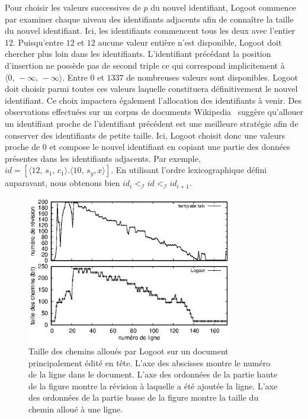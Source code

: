 Pour choisir les valeurs successives de $p$ du nouvel identifiant, Logoot
commence par examiner chaque niveau des identifiants adjacents afin de connaître
la taille du nouvel identifiant. Ici, les identifiants commencent tous les deux
avec l'entier $12$.  Puisqu'entre $12$ et $12$ aucune valeur entière n'est
disponible, Logoot doit chercher plus loin dans les identifiants. L'identifiant
précédant la position d'insertion ne possède pas de second triple ce qui
correspond implicitement à $\langle 0,\, -\infty ,\, -\infty \rangle$.  Entre
$0$ et $1337$ de nombreuses valeurs sont disponibles.  Logoot doit choisir parmi
toutes ces valeurs laquelle constituera définitivement le nouvel identifiant. Ce
choix impactera également l'allocation des identifiants à venir.
Des observations effectuées sur un corpus de documents
Wikipedia~\cite{wikipedia} suggère qu'allouer un identifiant proche de
l'identifiant précédent est une meilleure stratégie afin de conserver des
identifiants de petite taille.  Ici, Logoot choisit donc une valeurs proche de
$0$ et compose le nouvel identifiant en copiant une partie des données présentes
dans les identifiants adjacents. Par exemple,
$id = [\langle 12,\, s_1,\,c_1 \rangle.\langle 10,\,s_y, x\rangle]$.  En
utilisant l'ordre lexicographique défini auparavant, nous obtenons bien
$id_{i} <_\mathcal{I} id <_\mathcal{I} id_{i+1}$.

\begin{figure}
  \begin{center}
    \includegraphics[width=0.8\textwidth]{img/lseq/motivationlogoot.eps}
    \caption[Taille des chemins alloués par Logoot sur un document édité en
    tête]{\label{repl:img:motivationlogoot} Taille des chemins alloués par
      Logoot sur un document principalement édité en tête. L'axe des abscisses
      montre le numéro de la ligne dans le document. L'axe des ordonnées de la
      partie haute de la figure montre la révision à laquelle a été ajoutée la
      ligne. L'axe des ordonnées de la partie basse de la figure montre la taille
      du chemin alloué à une ligne.}
  \end{center}
\end{figure}

